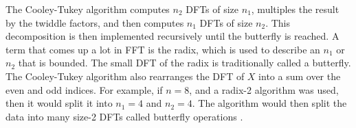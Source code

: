             The Cooley-Tukey algorithm computes $n_2$ DFTs of size $n_1$, multiples the
            result by the twiddle factors, and then computes $n_1$ DFTs of size
            $n_2$. This decomposition is then implemented recursively until the
            butterfly is reached. A term that comes up a
            lot in FFT is the radix, which is used to describe an $n_1$ or $n_2$ that is
            bounded. The small DFT of the radix is traditionally called a butterfly. The
            Cooley-Tukey algorithm also rearranges the DFT of $X$ into a sum over the even
            and odd indices.
            For example, if $n=8$, and a radix-2 algorithm was used, then it would split it
            into $n_1=4$ and $n_2=4$. The algorithm would then split the data into many
            size-2 DFTs called butterfly operations \cite{frigo2005design}.
%
%
%
